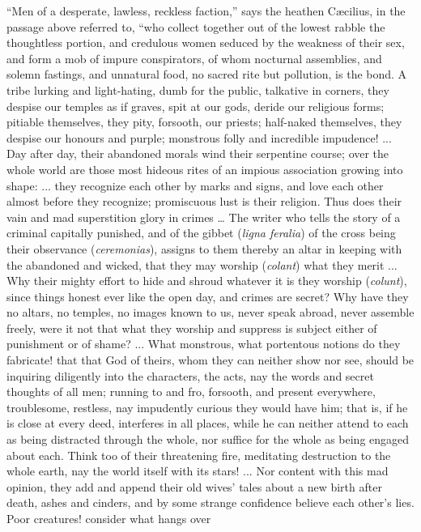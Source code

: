 ``Men of a desperate, lawless, reckless
faction,'' says the heathen Cæcilius, in the passage
above referred to, ``who collect together out of the
lowest rabble the thoughtless portion, and credulous
women seduced by the weakness of their sex, and form a
mob of impure conspirators, of whom nocturnal assemblies,
and solemn fastings, and unnatural food, no sacred rite
but pollution, is the bond. A tribe lurking and
light-hating, dumb for the public, talkative in corners,
they despise our temples as if graves, spit at our gods,
deride our religious forms; pitiable themselves, they
pity, forsooth, our priests; half-naked themselves, they
despise our honours and purple; monstrous folly and
incredible impudence! ... Day after day, their abandoned
morals wind their serpentine course; over the whole world
are those most hideous rites of an impious association
growing into shape: ... they recognize each other by
marks and signs, and love each other almost before they
recognize; promiscuous lust is their religion. Thus does
their vain and mad superstition glory in crimes …
The writer who tells the story of a criminal capitally
punished, and of the gibbet (\emph{ligna feralia}) of the
cross being their observance (\emph{ceremonias}), assigns
to them thereby an altar in keeping with the abandoned
and wicked, that they may worship (\emph{colant}) what
they merit ... Why their mighty effort to hide and shroud
whatever it is they worship (\emph{colunt}), since things
honest ever like the open day, and crimes are secret? Why
have they no altars, no temples, no images known to us,
never speak abroad, never assemble freely, were it not
that what they worship and suppress is subject either of
punishment or of shame? ... What monstrous, what
portentous notions do they fabricate! that that God of
theirs, whom they can neither show nor see, should be
inquiring diligently into the characters, the acts, nay
the words and secret thoughts of all men; running to and
fro, forsooth, and present everywhere, troublesome,
restless, nay impudently curious they would have him;
that is, if he is close at every deed, interferes in all
places, while he can neither attend to each as being
distracted through the whole, nor suffice for the whole
as being engaged about each. Think too of their
threatening fire, meditating destruction to the whole
earth, nay the world itself with its stars! ... Nor
content with this mad opinion, they add and append their
old wives' tales about a new birth after death, ashes and
cinders, and by some strange confidence believe each
other's lies. Poor creatures! consider what hangs over
